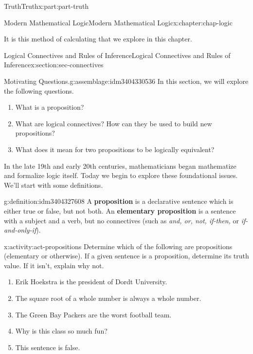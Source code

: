 \documentclass[oneside,10pt,]{book}
\newcommand{\terminology}[1]{\textbf{#1}}
\numberwithin{equation}{section}
\begin{document}
\begin{partptx}{Truth}{}{Truth}{}{}{x:part:part-truth}
\begin{chapterptx}{Modern Mathematical Logic}{}{Modern Mathematical Logic}{}{}{x:chapter:chap-logic}
\begin{introduction}{}
\par
It is this method of calculating that we explore in this chapter.%
\end{introduction}%
%
%
\typeout{************************************************}
\typeout{************************************************}
%
\begin{sectionptx}{Logical Connectives and Rules of Inference}{}{Logical Connectives and Rules of Inference}{}{}{x:section:sec-connectives}
\begin{assemblage}{Motivating Questions.}{g:assemblage:idm3404330536}%
In this section, we will explore the following questions. %
\begin{enumerate}
\item{}What is a proposition?%
\item{}What are logical connectives? How can they be used to build new propositions?%
\item{}What does it mean for two propositions to be logically equivalent?%
\end{enumerate}
%
\end{assemblage}
In the late 19th and early 20th centuries, mathematicians began mathematize and formalize logic itself. Today we begin to explore these foundational issues. We'll start with some definitions.%
\begin{definition}{}{g:definition:idm3404327608}%
%
%
%
A \terminology{proposition} is a declarative sentence which is either true or false, but not both. An \terminology{elementary proposition} is a sentence with a subject and a verb, but no connectives (such as \emph{and, or, not, if-then,} or \emph{if-and-only-if}).%
\end{definition}
\begin{activity}{}{x:activity:act-propositions}%
Determine which of the following are propositions (elementary or otherwise). If a given sentence is a proposition, determine its truth value. If it isn't, explain why not.%
%
\begin{enumerate}
\item{}Erik Hoekstra is the president of Dordt University.%
\item{}The square root of a whole number is always a whole number.%
\item{}The Green Bay Packers are the worst football team.%
\item{}Why is this class so much fun?%
\item{}This sentence is false.%

\end{enumerate}
\end{activity}
\end{sectionptx}
\end{chapterptx}
\end{partptx}
\end{document}
